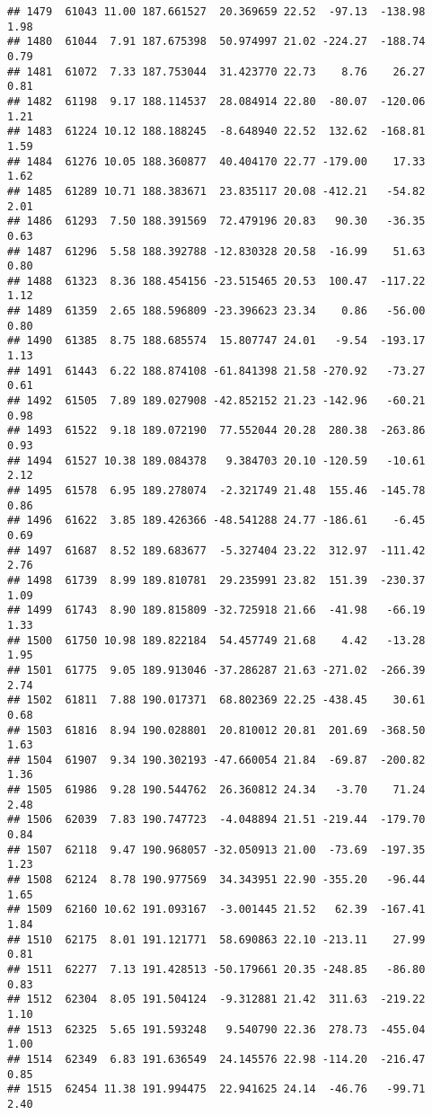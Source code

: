 \documentclass[]{article}
\begin{document}
\begin{verbatim}
## 1479  61043 11.00 187.661527  20.369659 22.52  -97.13  -138.98  1.98
## 1480  61044  7.91 187.675398  50.974997 21.02 -224.27  -188.74  0.79
## 1481  61072  7.33 187.753044  31.423770 22.73    8.76    26.27  0.81
## 1482  61198  9.17 188.114537  28.084914 22.80  -80.07  -120.06  1.21
## 1483  61224 10.12 188.188245  -8.648940 22.52  132.62  -168.81  1.59
## 1484  61276 10.05 188.360877  40.404170 22.77 -179.00    17.33  1.62
## 1485  61289 10.71 188.383671  23.835117 20.08 -412.21   -54.82  2.01
## 1486  61293  7.50 188.391569  72.479196 20.83   90.30   -36.35  0.63
## 1487  61296  5.58 188.392788 -12.830328 20.58  -16.99    51.63  0.80
## 1488  61323  8.36 188.454156 -23.515465 20.53  100.47  -117.22  1.12
## 1489  61359  2.65 188.596809 -23.396623 23.34    0.86   -56.00  0.80
## 1490  61385  8.75 188.685574  15.807747 24.01   -9.54  -193.17  1.13
## 1491  61443  6.22 188.874108 -61.841398 21.58 -270.92   -73.27  0.61
## 1492  61505  7.89 189.027908 -42.852152 21.23 -142.96   -60.21  0.98
## 1493  61522  9.18 189.072190  77.552044 20.28  280.38  -263.86  0.93
## 1494  61527 10.38 189.084378   9.384703 20.10 -120.59   -10.61  2.12
## 1495  61578  6.95 189.278074  -2.321749 21.48  155.46  -145.78  0.86
## 1496  61622  3.85 189.426366 -48.541288 24.77 -186.61    -6.45  0.69
## 1497  61687  8.52 189.683677  -5.327404 23.22  312.97  -111.42  2.76
## 1498  61739  8.99 189.810781  29.235991 23.82  151.39  -230.37  1.09
## 1499  61743  8.90 189.815809 -32.725918 21.66  -41.98   -66.19  1.33
## 1500  61750 10.98 189.822184  54.457749 21.68    4.42   -13.28  1.95
## 1501  61775  9.05 189.913046 -37.286287 21.63 -271.02  -266.39  2.74
## 1502  61811  7.88 190.017371  68.802369 22.25 -438.45    30.61  0.68
## 1503  61816  8.94 190.028801  20.810012 20.81  201.69  -368.50  1.63
## 1504  61907  9.34 190.302193 -47.660054 21.84  -69.87  -200.82  1.36
## 1505  61986  9.28 190.544762  26.360812 24.34   -3.70    71.24  2.48
## 1506  62039  7.83 190.747723  -4.048894 21.51 -219.44  -179.70  0.84
## 1507  62118  9.47 190.968057 -32.050913 21.00  -73.69  -197.35  1.23
## 1508  62124  8.78 190.977569  34.343951 22.90 -355.20   -96.44  1.65
## 1509  62160 10.62 191.093167  -3.001445 21.52   62.39  -167.41  1.84
## 1510  62175  8.01 191.121771  58.690863 22.10 -213.11    27.99  0.81
## 1511  62277  7.13 191.428513 -50.179661 20.35 -248.85   -86.80  0.83
## 1512  62304  8.05 191.504124  -9.312881 21.42  311.63  -219.22  1.10
## 1513  62325  5.65 191.593248   9.540790 22.36  278.73  -455.04  1.00
## 1514  62349  6.83 191.636549  24.145576 22.98 -114.20  -216.47  0.85
## 1515  62454 11.38 191.994475  22.941625 24.14  -46.76   -99.71  2.40

\end{verbatim}
\end{document}
